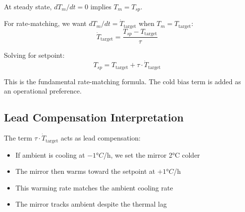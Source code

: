 \documentclass[11pt,letterpaper]{article}
\begin{document}
At steady state, $dT_m/dt = 0$ implies $T_m = T_{sp}$.

For rate-matching, we want $dT_m/dt = \dot{T}_\text{target}$ when $T_m = T_\text{target}$:
\begin{equation}
    \dot{T}_\text{target} = \frac{T_{sp} - T_\text{target}}{\tau}
\end{equation}

Solving for setpoint:
\begin{equation}
    T_{sp} = T_\text{target} + \tau \cdot \dot{T}_\text{target}
\end{equation}

This is the fundamental rate-matching formula. The cold bias term is added as an operational preference.

\subsection{Lead Compensation Interpretation}

The term $\tau \cdot \dot{T}_\text{target}$ acts as lead compensation:
\begin{itemize}
    \item If ambient is cooling at $-1°C$/h, we set the mirror 2°C colder
    \item The mirror then warms toward the setpoint at $+1°C$/h
    \item This warming rate matches the ambient cooling rate
    \item The mirror tracks ambient despite the thermal lag
\end{itemize}
\end{document}
